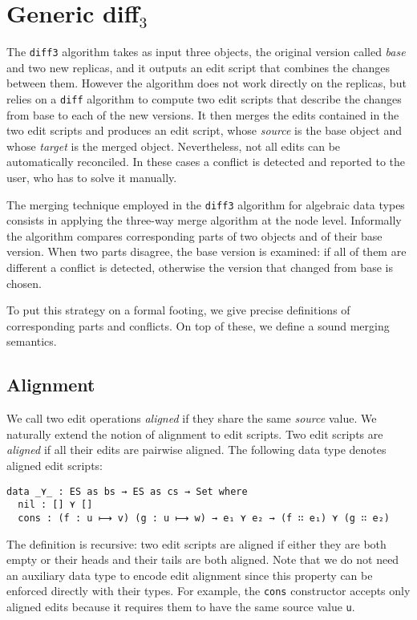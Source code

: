 \documentclass{sigplanconf}
\theoremstyle{plain}
\begin{document}
\section{Generic diff$_3$}
	The \texttt{diff3} algorithm takes as input three objects, the original
	version called \emph{base} and two new replicas, and it outputs an
	edit script that combines the changes between them.
	However the algorithm does not work directly on the replicas, but relies
	on a \texttt{diff} algorithm to compute two edit scripts that describe
	the changes from base to each of the new versions.
	It then merges the edits contained in the two edit scripts and produces
	an edit script, whose \emph{source} is the base object and whose 
	\emph{target} is the merged object.
	Nevertheless, not all edits can be automatically reconciled.
	In these cases a conflict is detected and reported to the user, who has
	to solve it manually.
		
	The merging technique employed in the \texttt{diff3} algorithm for
	algebraic data types consists in applying the three-way merge algorithm
	at the node level. 
	Informally the algorithm compares corresponding parts 
	of two objects and of their base version.
	When two parts disagree, the base version is examined:
	if all of them are different a conflict is detected, 
        otherwise the version that changed from base is chosen.
	
	To put this strategy on a formal footing, we give precise definitions
	of corresponding parts and conflicts.
	On top of these, we define a sound merging semantics.

	\subsection{Alignment}
        \label{subsec:alignment}
	We call two edit operations \emph{aligned} if they share the
        same \emph{source} value.
        We naturally extend the notion of alignment to edit
        scripts.
        Two edit scripts are \emph{aligned} if all their edits are
        pairwise aligned. The following data type denotes aligned edit
        scripts:
\begin{verbatim}
data _⋎_ : ES as bs → ES as cs → Set where
  nil : [] ⋎ []
  cons : (f : u ⟼ v) (g : u ⟼ w) → e₁ ⋎ e₂ → (f ∷ e₁) ⋎ (g ∷ e₂)
\end{verbatim}
	The definition is recursive: two edit scripts are aligned if
        either they are both empty or their heads and their tails are
        both aligned.
	Note that we do not need an auxiliary data type to encode edit
        alignment since this property can be enforced directly with
        their types.
	For example, the \texttt{cons} constructor accepts only aligned
        edits because it requires them to have the same source value
        \texttt{u}.
	
\end{document}
